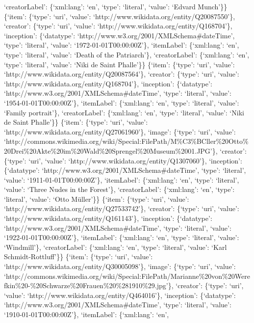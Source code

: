 \documentclass[
  letterpaper,
]{book}
\begin{document}
`creatorLabel': \{`xml:lang': `en', `type': `literal', `value': `Edvard
Munch'\}\} \{`item': \{`type': `uri', `value':
`http://www.wikidata.org/entity/Q20087550'\}, `creator': \{`type':
`uri', `value': `http://www.wikidata.org/entity/Q168704'\}, `inception':
\{`datatype': `http://www.w3.org/2001/XMLSchema\#dateTime', `type':
`literal', `value': `1972-01-01T00:00:00Z'\}, `itemLabel': \{`xml:lang':
`en', `type': `literal', `value': `Death of the Patriarch'\},
`creatorLabel': \{`xml:lang': `en', `type': `literal', `value': `Niki de
Saint Phalle'\}\} \{`item': \{`type': `uri', `value':
`http://www.wikidata.org/entity/Q20087564'\}, `creator': \{`type':
`uri', `value': `http://www.wikidata.org/entity/Q168704'\}, `inception':
\{`datatype': `http://www.w3.org/2001/XMLSchema\#dateTime', `type':
`literal', `value': `1954-01-01T00:00:00Z'\}, `itemLabel': \{`xml:lang':
`en', `type': `literal', `value': `Family portrait'\}, `creatorLabel':
\{`xml:lang': `en', `type': `literal', `value': `Niki de Saint
Phalle'\}\} \{`item': \{`type': `uri', `value':
`http://www.wikidata.org/entity/Q27061960'\}, `image': \{`type': `uri',
`value':
`http://commons.wikimedia.org/wiki/Special:FilePath/M\%C3\%BCller\%20Otto\%20Drei\%20Akte\%20im\%20Wald\%20Sprengel\%20Museum\%2001.JPG'\},
`creator': \{`type': `uri', `value':
`http://www.wikidata.org/entity/Q1307060'\}, `inception': \{`datatype':
`http://www.w3.org/2001/XMLSchema\#dateTime', `type': `literal',
`value': `1911-01-01T00:00:00Z'\}, `itemLabel': \{`xml:lang': `en',
`type': `literal', `value': `Three Nudes in the Forest'\},
`creatorLabel': \{`xml:lang': `en', `type': `literal', `value': `Otto
Müller'\}\} \{`item': \{`type': `uri', `value':
`http://www.wikidata.org/entity/Q27533742'\}, `creator': \{`type':
`uri', `value': `http://www.wikidata.org/entity/Q161143'\}, `inception':
\{`datatype': `http://www.w3.org/2001/XMLSchema\#dateTime', `type':
`literal', `value': `1922-01-01T00:00:00Z'\}, `itemLabel': \{`xml:lang':
`en', `type': `literal', `value': `Windmill'\}, `creatorLabel':
\{`xml:lang': `en', `type': `literal', `value': `Karl
Schmidt-Rottluff'\}\} \{`item': \{`type': `uri', `value':
`http://www.wikidata.org/entity/Q30005098'\}, `image': \{`type': `uri',
`value':
`http://commons.wikimedia.org/wiki/Special:FilePath/Marianne\%20von\%20Werefkin\%20-\%20Schwarze\%20Frauen\%20\%281910\%29.jpg'\},
`creator': \{`type': `uri', `value':
`http://www.wikidata.org/entity/Q464016'\}, `inception': \{`datatype':
`http://www.w3.org/2001/XMLSchema\#dateTime', `type': `literal',
`value': `1910-01-01T00:00:00Z'\}, `itemLabel': \{`xml:lang': `en',
\end{document}
